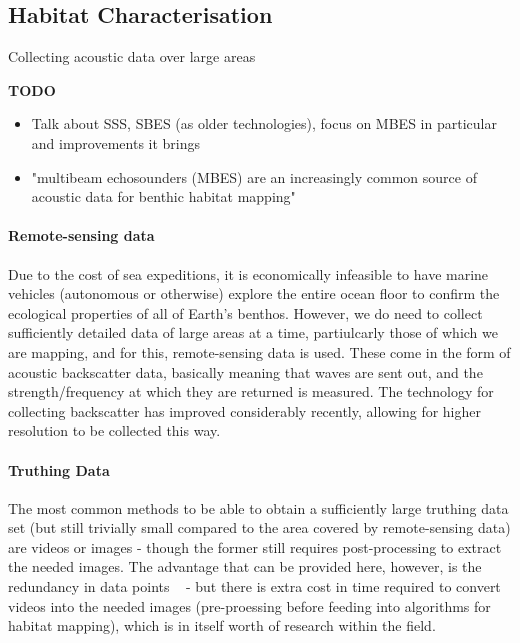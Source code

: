 \documentclass[12pt]{article}
\begin{document}
\begin{multicols}{2}
            \subsection{Habitat Characterisation}
            Collecting acoustic data over large areas 

            \textbf{TODO} 
            \begin{itemize}
                \item Talk about SSS, SBES (as older technologies), focus on MBES in particular and improvements it brings
                \item "multibeam echosounders (MBES) are an increasingly common source of acoustic data for benthic habitat mapping" ~\citep{calvert15}
            \end{itemize}

            \paragraph{Remote-sensing data}
            Due to the cost of sea expeditions, it is economically infeasible to have marine vehicles (autonomous or otherwise) explore the entire ocean floor to confirm the ecological properties of all of Earth's benthos. However, we do need to collect sufficiently detailed data of large areas at a time, partiulcarly those of which we are mapping, and for this, remote-sensing data is used. These come in the form of acoustic backscatter data, basically meaning that waves are sent out, and the strength/frequency at which they are returned is measured. The technology for collecting backscatter has improved considerably recently, allowing for higher resolution to be collected this way.

            \paragraph{Truthing Data}
            The most common methods to be able to obtain a sufficiently large truthing data set (but still trivially small compared to the area covered by remote-sensing data) are videos or images - though the former still requires post-processing to extract the needed images. The advantage that can be provided here, however, is the redundancy in data points ~\citep{rattray14}  - but there is extra cost in time required to convert videos into the needed images (pre-proessing before feeding into algorithms for habitat mapping), which is in itself worth of research within the field.~\citep{lucieer13}


\end{multicols}
\end{document}
